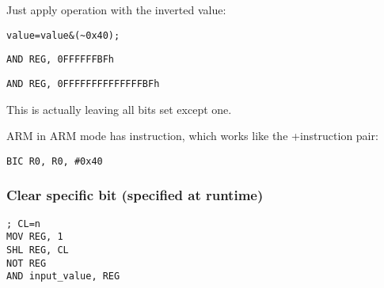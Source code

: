 Just apply \AND operation with the inverted value:

\begin{lstlisting}[caption=\CCpp,style=customc]
value=value&(~0x40);
\end{lstlisting}

\begin{lstlisting}[caption=x86,style=customasmx86]
AND REG, 0FFFFFFBFh
\end{lstlisting}

\begin{lstlisting}[caption=x64,style=customasmx86]
AND REG, 0FFFFFFFFFFFFFFBFh
\end{lstlisting}

This is actually leaving all bits set except one.


ARM in ARM mode has \BIC instruction, which works like the \NOT+\AND instruction pair:

\begin{lstlisting}[caption=ARM (\ARMMode),style=customasmARM]
BIC R0, R0, #0x40
\end{lstlisting}

\subsubsection{
Clear specific bit (specified at runtime)}



\begin{lstlisting}[caption=x86,style=customasmx86]
; CL=n
MOV REG, 1
SHL REG, CL
NOT REG
AND input_value, REG
\end{lstlisting}
